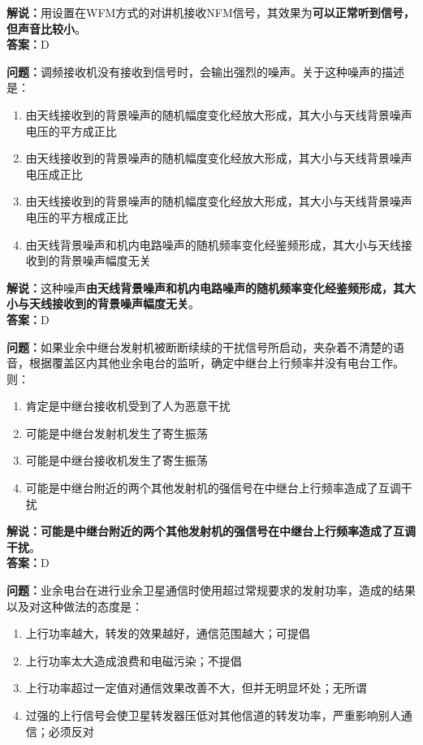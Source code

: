 \documentclass{ctexbook}
\begin{document}
\noindent\textbf{解说：}用设置在WFM方式的对讲机接收NFM信号，其效果为\textbf{可以正常听到信号，但声音比较小}。\\\noindent\textbf{答案：}D

\bigskip


\noindent\textbf{问题：}调频接收机没有接收到信号时，会输出强烈的噪声。关于这种噪声的描述是：

\begin{enumerate}[label=\Alph*), leftmargin=3em]
	\item 由天线接收到的背景噪声的随机幅度变化经放大形成，其大小与天线背景噪声电压的平方成正比
	\item 由天线接收到的背景噪声的随机幅度变化经放大形成，其大小与天线背景噪声电压成正比
	\item 由天线接收到的背景噪声的随机幅度变化经放大形成，其大小与天线背景噪声电压的平方根成正比
	\item 由天线背景噪声和机内电路噪声的随机频率变化经鉴频形成，其大小与天线接收到的背景噪声幅度无关
\end{enumerate}

\noindent\textbf{解说：}这种噪声\textbf{由天线背景噪声和机内电路噪声的随机频率变化经鉴频形成，其大小与天线接收到的背景噪声幅度无关}。\\\noindent\textbf{答案：}D%

\bigskip


\noindent\textbf{问题：}如果业余中继台发射机被断断续续的干扰信号所启动，夹杂着不清楚的语音，根据覆盖区内其他业余电台的监听，确定中继台上行频率并没有电台工作。则：

\begin{enumerate}[label=\Alph*), leftmargin=3em]
	\item 肯定是中继台接收机受到了人为恶意干扰
	\item 可能是中继台发射机发生了寄生振荡
	\item 可能是中继台接收机发生了寄生振荡
	\item 可能是中继台附近的两个其他发射机的强信号在中继台上行频率造成了互调干扰
\end{enumerate}

\noindent\textbf{解说：可能是中继台附近的两个其他发射机的强信号在中继台上行频率造成了互调干扰}。\\\noindent\textbf{答案：}D%


\bigskip


\noindent\textbf{问题：}业余电台在进行业余卫星通信时使用超过常规要求的发射功率，造成的结果以及对这种做法的态度是：

\begin{enumerate}[label=\Alph*), leftmargin=3em]
	\item 上行功率越大，转发的效果越好，通信范围越大；可提倡
	\item 上行功率太大造成浪费和电磁污染；不提倡
	\item 上行功率超过一定值对通信效果改善不大，但并无明显坏处；无所谓
	\item 过强的上行信号会使卫星转发器压低对其他信道的转发功率，严重影响别人通信；必须反对
\end{enumerate}
\end{document}
